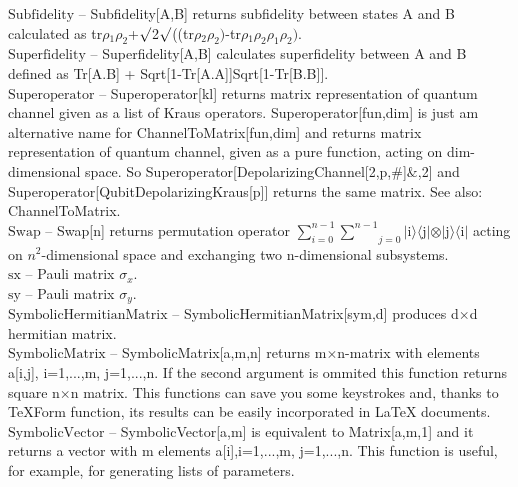 \documentclass[a4paper,10pt]{scrartcl}
\begin{document}
\textbf{$ \text{Subfidelity} $ }-- Subfidelity[A,B] returns subfidelity between states A and B calculated as $  $tr$\rho $$ _1\rho _2 $+$\surd $2$\surd $(($  $tr$\rho $$ _2\rho _2\text{)-} $tr$\rho $$ _1\rho _2\rho _1\rho _2\text{).} $\\

\textbf{$ \text{Superfidelity} $ }-- Superfidelity[A,B] calculates superfidelity between A and B defined as Tr[A.B] + Sqrt[1-Tr[A.A]]Sqrt[1-Tr[B.B]].$  $\\

\textbf{$ \text{Superoperator} $ }-- Superoperator[kl] returns matrix representation of quantum channel given as a list of Kraus operators. Superoperator[fun,dim] is just am alternative name for ChannelToMatrix[fun,dim] and returns matrix representation of quantum channel, given as a pure function, acting on dim-dimensional space. So Superoperator[DepolarizingChannel[2,p,$\#$]$\&$,2] and Superoperator[QubitDepolarizingKraus[p]] returns the same matrix. See also: ChannelToMatrix.$  $\\

\textbf{$ \text{Swap} $ }-- Swap[n] returns permutation operator $ \sum _{i=0}^{n-1} \underset{j=0}{\overset{n-1}{ \sum }} $$|$i$\rangle \langle $j$|\otimes |$j$\rangle \langle $i$|$ acting on $ n^2 $-dimensional space and exchanging two n-dimensional subsystems.$  $\\

\textbf{$ \text{sx} $ }-- Pauli matrix $ \sigma _x. $\\

\textbf{$ \text{sy} $ }-- Pauli matrix $ \sigma _y. $\\

\textbf{$ \text{SymbolicHermitianMatrix} $ }-- SymbolicHermitianMatrix[sym,d] produces d$\times $d hermitian matrix.$  $\\

\textbf{$ \text{SymbolicMatrix} $ }-- SymbolicMatrix[a,m,n] returns m$\times $n-matrix with elements a[i,j], i=1,...,m, j=1,...,n. If the second argument is ommited this function returns square n$\times $n matrix. This functions can save you some keystrokes and, thanks to TeXForm function, its results can be easily incorporated in LaTeX documents.$  $\\

\textbf{$ \text{SymbolicVector} $ }-- SymbolicVector[a,m] is equivalent to Matrix[a,m,1] and it returns a vector with m elements a[i],i=1,...,m, j=1,...,n. This function is useful, for example, for generating lists of parameters.$  $\\
\end{document}
